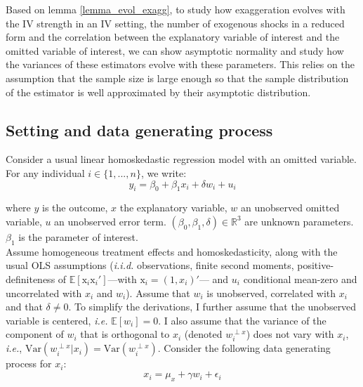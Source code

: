\documentclass[usletter, 12pt]{article}
\begin{document}
				 Based on lemma \ref{lemma_evol_exagg}, to study how exaggeration evolves with the IV strength in an IV setting, the number of exogenous shocks in a reduced form and the correlation between the explanatory variable of interest and the omitted variable of interest, we can show asymptotic normality and study how the variances of these estimators evolve with these parameters. This relies on the assumption that the sample size is large enough so that the sample distribution of the estimator is well approximated by their asymptotic distribution.
				 				 
		\subsection{Setting and data generating process}\label{maths_dgp}
		
			Consider a usual linear homoskedastic regression model with an omitted variable. For any individual $i \in \{1, ..., n\}$, we write:
				~
				\begin{equation}\label{maths_dgp_y}
					y_i = \beta_{0} + \beta_{1}x_{i} + \delta w_{i} + u_i
				\end{equation}
				
				where $y$ is the outcome, $x$ the explanatory variable,  $w$ an unobserved omitted variable, $u$ an unobserved error term.  $(\beta_0, \beta_1, \delta) \in \mathbb{R}^{3}$ are unknown parameters. $\beta_1$ is the parameter of interest.\\
			
			Assume homogeneous treatment effects and homoskedasticity, along with the usual OLS assumptions (\textit{i.i.d.} observations, finite second moments, positive-definiteness of $\mathbb{E}[\text{x}_i \text{x}_i']$---with $\text{x}_i = (1, x_i)'$--- and $u_{i}$ conditional mean-zero and uncorrelated with $x_i$ and $w_i$). Assume that $w_{i}$ is unobserved, correlated with $x_{i}$ and that $\delta \neq 0$. To simplify the derivations, I further assume that the unobserved variable is centered, \textit{i.e.} $\mathbb{E}[w_i] = 0$. I also assume that the variance of the component of $w_{i}$ that is orthogonal to $x_{i}$ (denoted $w_{i}^{\perp x}$) does not vary with $x_{i}$, \textit{i.e.}, $\text{Var}(w_{i}^{\perp x}|x_{i}) = \text{Var}(w_{i}^{\perp x})$. Consider the following data generating process for $x_i$:
				~
				\begin{equation}\label{maths_dgp_x}
					x_i = \mu_{x} + \gamma w_{i} + \epsilon_i
				\end{equation}
				
\end{document}
